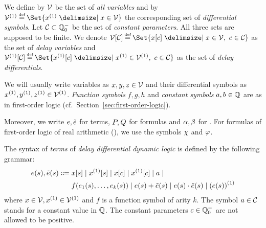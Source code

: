     We define by $\mathcal{V}$ be the set of \emph{all variables} and by $\diffvars\defeq\Set{\D{x} \with x\in\allvars}$ the corresponding set of \emph{differential symbols}.
    Let $\mathcal{C}_{}\subset\mathbb{Q}^-_0$ be the set of \emph{constant parameters}.
    All three sets are supposed to be finite.
    We denote $\delayvars\defeq\Set{\x[c] \with x\in\allvars,\ c\in\constants}$ as the set of \emph{delay variables} and $\delaydiffvars\defeq\Set{\Dx[c] \with \D{x}\in\diffvars,\ c\in\constants}$ as the set of \emph{delay differentials}.

    We will usually write variables as $x,y,z\in\mathcal{V}$ and their differential symbols as $\D{x},\D{y},\D{z}\in\diffvars$.
    \emph{Function symbols} $f,g,h$ and \emph{constant symbols} $a,b\in\mathbb{Q}$
    are as in first-order logic (cf.\ Section~\ref{sec:first-order-logic}).

    Moreover, we write $e,\tilde{e}$ for \ddL terms, $P,Q$ for \ddL formulas and $\alpha,\beta$ for \dHPs. For formulas of first-order logic of real arithmetic (\FOLR), we use the symbols $\chi$ and $\varphi$.

    \begin{definition}[s-Terms]\label{def:syntax-terms}
        The syntax of \emph{terms} of \emph{delay differential dynamic logic} is defined by the following grammar:
        \begin{align*}
            \astrm(s),\bstrm(s) \Coloneqq{}&
                \x[s] \mid
                \Dx[s] \mid
                \x[c] \mid
                \Dx[c] \mid
                a \mid\\
                & f(\range{\istrm{1}(s)}{\istrm{k}(s)}) \mid
                \astrm(s) + \bstrm(s) \mid
                \astrm(s) \cdot \bstrm(s) \mid
                \D{(\astrm(s))}
        \end{align*}
        where $x\in\allvars,\D{x}\in\diffvars$ and $f$ is a function symbol of arity $k$.
        The symbol $a\in\mathcal{C}_{}$ stands for a constant value in $\mathbb{Q}$. The constant parameters $c\in\mathbb{Q}^-_0$ are not allowed to be positive.
    \end{definition}


